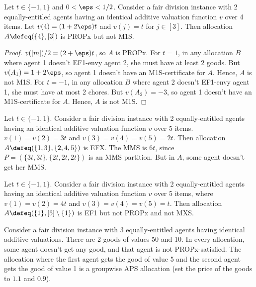 \begin{lemma}
\label{cex:propx-not-m1s}
Let $t \in \{-1, 1\}$ and $0 < \eps < 1/2$.
Consider a fair division instance with 2 equally-entitled agents having
an identical additive valuation function $v$ over 4 items.
Let $v(4) = (1+2\eps)t$ and $v(j) = t$ for $j \in [3]$.
Then allocation $A \defeq (\{4\}, [3])$ is PROPx but not M1S.
\end{lemma}
\begin{proof}
$v([m])/2 = (2+\eps)t$, so $A$ is PROPx.
%
For $t = 1$, in any allocation $B$ where agent 1 doesn't EF1-envy agent 2, she must have at least 2 goods.
But $v(A_1) = 1+2\eps$, so agent 1 doesn't have an M1S-certificate for $A$. Hence, $A$ is not M1S.
%
For $t = -1$, in any allocation $B$ where agent 2 doesn't EF1-envy agent 1, she must have at most 2 chores.
But $v(A_2) = -3$, so agent 1 doesn't have an M1S-certificate for $A$. Hence, $A$ is not M1S.
\end{proof}

\begin{example}
\label{cex:efx-not-mms}
Let $t \in \{-1, 1\}$.
Consider a fair division instance with 2 equally-entitled agents having
an identical additive valuation function $v$ over 5 items.
$v(1) = v(2) = 3t$ and $v(3) = v(4) = v(5) = 2t$.
Then allocation $A \defeq (\{1, 3\}, \{2, 4, 5\})$ is EFX.
The MMS is $6t$, since $P = (\{3t, 3t\}, \{2t, 2t, 2t\})$ is an MMS partition.
But in $A$, some agent doesn't get her MMS.
\end{example}

\begin{example}
\label{cex:ef1-not-propx-mxs}
Let $t \in \{-1, 1\}$.
Consider a fair division instance with 2 equally-entitled agents
having an identical additive valuation function $v$ over 5 items,
where $v(1) = v(2) = 4t$ and $v(3) = v(4) = v(5) = t$.
Then allocation $A \defeq (\{1\}, [5] \setminus \{1\})$ is EF1 but not PROPx and not MXS.
\end{example}

\begin{example}
\label{cex:gaps-not-propx}
Consider a fair division instance with 3 equally-entitled agents
having identical additive valuations. There are 2 goods of values 50 and 10.
In every allocation, some agent doesn't get any good, and that agent is not PROPx-satisfied.
The allocation where the first agent gets the good of value 5
and the second agent gets the good of value 1 is a groupwise APS allocation
(set the price of the goods to $1.1$ and $0.9$).
\end{example}

